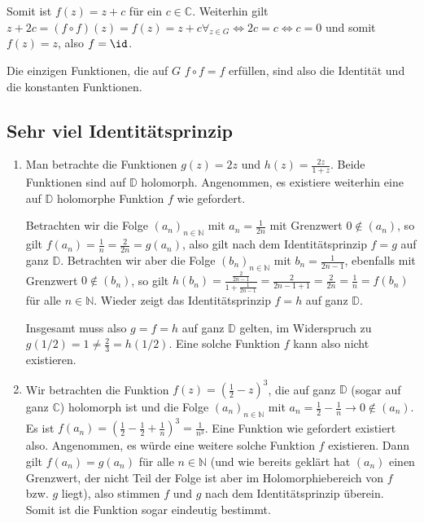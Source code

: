 \documentclass[a4paper]{article}
\begin{document}
Somit ist $f(z) = z + c$ für ein $c \in \mathds{C}$.
Weiterhin gilt $z + 2c = (f \circ f )(z) = f(z) = z + c \forall_{z \in G} \iff 2c = c \iff c = 0$ und somit $f(z) = z$, also $f = \id$.

Die einzigen Funktionen, die auf $G$ $f \circ f = f$ erfüllen, sind also die Identität und die konstanten Funktionen.

\subsection{Sehr viel Identitätsprinzip}

\begin{enumerate}[label=(\alph*)]
	\item Man betrachte die Funktionen $g(z) = 2z$ und $h(z) = \frac{2z}{1 + z}$.
	Beide Funktionen sind auf $\mathds{D}$ holomorph.
	Angenommen, es existiere weiterhin eine auf $\mathds{D}$ holomorphe Funktion $f$ wie gefordert.

	Betrachten wir die Folge $(a_n)_{n \in \mathds{N}}$ mit $a_n = \frac{1}{2n}$ mit Grenzwert $0 \notin (a_n)$, so gilt $f(a_n) = \frac{1}{n} = \frac{2}{2n} = g(a_n)$, also gilt nach dem Identitätsprinzip $f = g$ auf ganz $\mathds{D}$.
	Betrachten wir aber die Folge $(b_n)_{n \in \mathds{N}}$ mit $b_n = \frac{1}{2n-1}$, ebenfalls mit Grenzwert $0 \notin (b_n)$, so gilt $h(b_n) = \frac{\frac{2}{2n - 1}}{1 + \frac{1}{2n -1}} = \frac{2}{2n-1 + 1} = \frac{2}{2n} =  \frac{1}{n} = f(b_n)$ für alle $n \in \mathds{N}$.
	Wieder zeigt das Identitätsprinzip $f = h$ auf ganz $\mathds{D}$.

	Insgesamt muss also $g = f = h$ auf ganz $\mathds{D}$ gelten, im Widerspruch zu $g(1/2) = 1 \neq \frac{2}{3} = h(1/2)$.
	Eine solche Funktion $f$ kann also nicht existieren.
	\item Wir betrachten die Funktion $f(z) = (\frac{1}{2} - z)^3$, die auf ganz $\mathds{D}$ (sogar auf ganz $\mathds{C}$) holomorph ist und die Folge $(a_n)_{n \in \mathds{N}}$ mit $a_n = \frac{1}{2} - \frac{1}{n} \to 0 \notin (a_n)$.
	Es ist $f(a_n) = (\frac{1}{2} - \frac{1}{2} + \frac{1}{n})^3 = \frac{1}{n^3}$.
	Eine Funktion wie gefordert existiert also.
	Angenommen, es würde eine weitere solche Funktion $f$ existieren.
	Dann gilt $f(a_n) = g(a_n)$ für alle $n \in \mathds{N}$ (und wie bereits geklärt hat $(a_n)$ einen Grenzwert, der nicht Teil der Folge ist aber im Holomorphiebereich von $f$ bzw. $g$ liegt), also stimmen $f$ und $g$ nach dem Identitätsprinzip überein.
	Somit ist die Funktion sogar eindeutig bestimmt.
\end{enumerate}
\end{document}

